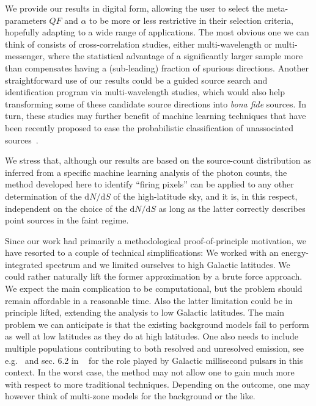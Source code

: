 \documentclass{article}
\def\dNdS{\textrm{d}N/\textrm{d}S}
\begin{document}
We provide our results in digital form, allowing the user to select the meta-parameters $QF$ and $\alpha$ to be more or less restrictive in their selection criteria, hopefully adapting to a wide range of applications. The most obvious one we can think of consists of cross-correlation studies, either multi-wavelength or multi-messenger, where the statistical advantage of  a significantly larger sample more than compensates having a (sub-leading) fraction of spurious directions. 
Another straightforward use of our results could be a guided source search and identification program via multi-wavelength studies, which would also help transforming some of these candidate source directions into  \textit{bona fide} sources. In turn, these studies may further benefit of machine learning techniques that have been recently proposed to ease the  probabilistic classification of unassociated sources~\cite{Bhat:2022}.

We stress that, although our results are based on the source-count distribution as inferred from a specific machine learning analysis of the photon counts, the method developed here to identify ``firing pixels'' can be applied to any other determination of the $\dNdS$ of the high-latitude sky, and it is, in this respect, independent on the choice of the $\dNdS$ as long as the latter correctly describes point sources in the faint regime.

Since our work had primarily a methodological proof-of-principle motivation, we have resorted to a couple of technical simplifications: We worked with an energy-integrated spectrum and we limited ourselves to high Galactic latitudes. We could rather naturally lift the former approximation  by a brute force approach. We expect the main complication to be computational, but the problem should remain affordable in a reasonable time. Also the latter limitation could be in principle lifted, extending the analysis to low Galactic latitudes. The main problem we can anticipate is that the existing background models fail to perform as well at low latitudes as they do at high latitudes. One also needs to include multiple populations contributing to both resolved and unresolved emission, see e.g.~\cite{Calore:2014oga} and sec. 6.2 in ~\cite{Fermi-LAT:2015bhf} for the role played by Galactic millisecond pulsars in this context. In the worst case, the method may not allow one to gain much more with respect to more traditional techniques. Depending on the outcome, one may however think of multi-zone models for the background or the like.  
\end{document}
